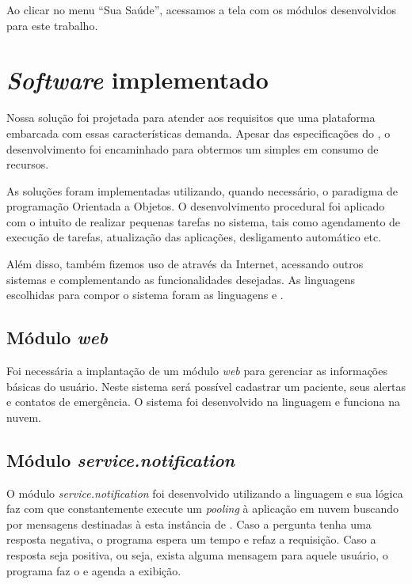 Ao clicar no menu ``Sua Saúde'', acessamos a tela com os módulos desenvolvidos
para este trabalho. 


\section{\textit{Software} implementado}\label{sec:software-implementado}

Nossa solução foi projetada para atender aos requisitos que uma plataforma
embarcada com essas características demanda. Apesar das especificações do
\hardware[], o desenvolvimento foi encaminhado para obtermos um \software[]
simples em consumo de recursos.

As soluções foram implementadas utilizando, quando necessário, o paradigma
de programação Orientada a Objetos. O desenvolvimento procedural foi aplicado
com o intuito de realizar pequenas tarefas no sistema, tais como agendamento
de execução de tarefas, atualização das aplicações, desligamento automático etc.

Além disso, também fizemos uso de \webservices[] através da Internet, acessando
outros sistemas e complementando as funcionalidades desejadas. As linguagens
escolhidas para compor o sistema foram as linguagens \python[] e \shell.

\subsection{Módulo \textit{web}}

Foi necessária a implantação de um módulo \textit{web} para gerenciar as 
informações básicas do usuário. Neste sistema será possível cadastrar um 
paciente, seus alertas e contatos de emergência. O sistema foi desenvolvido
na linguagem \python[] e funciona na nuvem.

\subsection{Módulo \textit{service.notification}}\label{subsec:notification}

O módulo \textit{service.notification} foi desenvolvido utilizando a linguagem
\python[] e sua lógica faz com que constantemente execute um \textit{pooling} 
à aplicação em nuvem buscando por mensagens destinadas à esta instância de 
\software. Caso a pergunta tenha uma resposta negativa, o programa espera um 
tempo e refaz a requisição. Caso a resposta seja positiva, ou seja, exista 
alguma mensagem para aquele usuário, o programa faz o \download[] e agenda a
exibição. 


